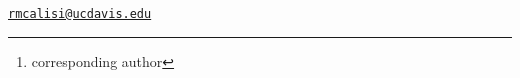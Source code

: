 \address{%
Tanner Feustel\\
University of California, Davis\\
\\
}


\address{%
Matthew D. MacManes\\
University of New Hampshire\\
\\
}


\address{%
Rebecca M. Calisi \footnote{corresponding author}\\
University of California, Davis\\
\\
}
\href{mailto:rmcalisi@ucdavis.edu}{\nolinkurl{rmcalisi@ucdavis.edu}}

